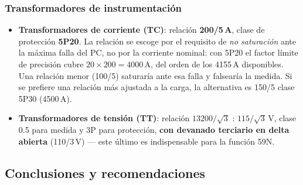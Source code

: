 \documentclass[11pt,a4paper]{article}
\begin{document}
\subsubsection{Transformadores de instrumentaci\'on}

\begin{itemize}
\item \textbf{Transformadores de corriente (TC)}: relaci\'on \textbf{200/5\,A}, clase de protecci\'on \textbf{5P20}. La relaci\'on se escoge por el requisito de \emph{no saturaci\'on} ante la m\'axima falla del PC, no por la corriente nominal: con 5P20 el factor l\'imite de precisi\'on cubre $20\times200 = 4000$\,A, del orden de los 4155\,A disponibles. Una relaci\'on menor (100/5) saturar\'ia ante esa falla y falsear\'ia la medida. Si se prefiere una relaci\'on m\'as ajustada a la carga, la alternativa es 150/5 clase 5P30 (4500\,A).
\item \textbf{Transformadores de tensi\'on (TT)}: relaci\'on $13200/\sqrt{3}$ : $115/\sqrt{3}$\,V, clase 0.5 para medida y 3P para protecci\'on, \textbf{con devanado terciario en delta abierta} (110/3\,V) --- este \'ultimo es indispensable para la funci\'on 59N.
\end{itemize}


\subsection{Conclusiones y recomendaciones}
\end{document}
